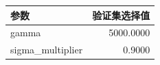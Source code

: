 \begin{center}
\small
\begin{tabular}{lr}
\toprule
参数 & 验证集选择值 \\
\midrule
gamma & 5000.0000 \\
sigma\_multiplier & 0.9000 \\
\bottomrule
\end{tabular}
\end{center}